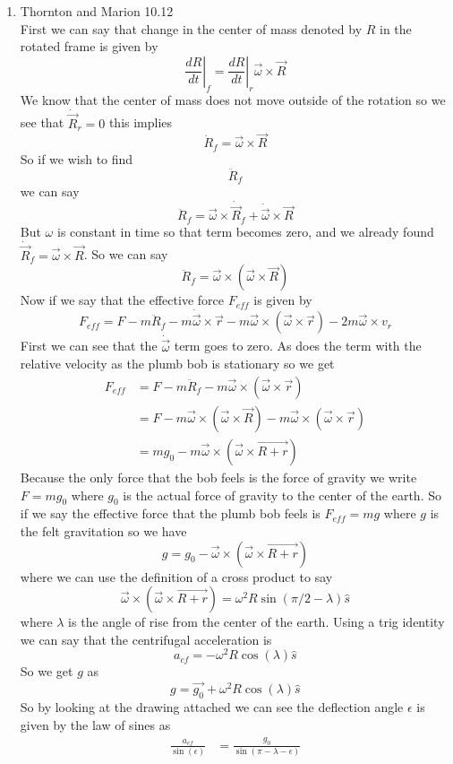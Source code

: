 \documentclass[11pt]{article}
\numberwithin{equation}{section}
\begin{document}
\begin{enumerate}
\item Thornton and Marion 10.12 \\
First we can say that change in the center of mass denoted by $R$ in the rotated frame is given by
$$\left.\frac{dR}{dt}\right|_f = \left.\frac{dR}{dt}\right|_r \vec{\omega}\times\vec{R}$$
We know that the center of mass does not move outside of the rotation so we see that $\dot{\vec{R}}_r = 0$ this implies
$$\dot{R}_f = \vec{\omega}\times\vec{R}$$
So if we wish to find $$\ddot{R}_f$$ we can say
$$\ddot{R}_f = \vec{\omega}\times\dot{\vec{R}}_f+\dot{\vec{\omega}}\times\vec{R}$$
But $\omega$ is constant in time so that term becomes zero, and we already found $\dot{\vec{R}}_f =  \vec{\omega}\times\vec{R}$. So we can say
$$\ddot{R}_f = \vec{\omega}\times(\vec{\omega}\times\vec{R})$$
Now if we say that the effective force $F_{eff}$ is given by
$$F_{eff} = F - m\ddot{R}_f - m\dot{\vec{\omega}}\times\vec{r} - m\vec{\omega}\times(\vec{\omega}\times\vec{r}) - 2m\vec{\omega}\times v_r$$
First we can see that the $\dot{\vec{\omega}}$ term goes to zero. As does the term with the relative velocity as the plumb bob is stationary so we get
\begin{align*}
F_{eff} &= F - m\ddot{R}_f - m\vec{\omega}\times(\vec{\omega}\times\vec{r})\\
&= F - m \vec{\omega}\times(\vec{\omega}\times\vec{R})- m\vec{\omega}\times(\vec{\omega}\times\vec{r})\\
&= mg_0 - m\vec{\omega}\times(\vec{\omega}\times\vec{R+r})
\end{align*}
Because the only force that the bob feels is the force of gravity we write $F=mg_0$ where $g_0$ is the actual force of gravity to the center of the earth. So if we say the effective force that the plumb bob feels is $F_{eff} = mg$ where $g$ is the felt gravitation so we have
$$ g = g_0 - \vec{\omega}\times(\vec{\omega}\times\vec{R+r})$$
where we can use the definition of a cross product to say
$$\vec{\omega}\times(\vec{\omega}\times\vec{R+r})=\omega^2R\sin(\pi/2-\lambda)\hat{s}$$
where $\lambda$ is the angle of rise from the center of the earth. Using a trig identity we can say that the centrifugal acceleration is
$$a_{cf}=-\omega^2R\cos(\lambda)\hat{s}$$
So we get $g$ as
$$g=\vec{g_0}+\omega^2R\cos(\lambda)\hat{s}$$
So by looking at the drawing attached we can see the deflection angle $\epsilon$ is given by the law of sines as
\begin{align*}
\frac{a_{cf}}{\sin(\epsilon)} &= \frac{g_0}{\sin(\pi-\lambda-\epsilon)}\\

\end{align*}
\end{enumerate}
\end{document}

